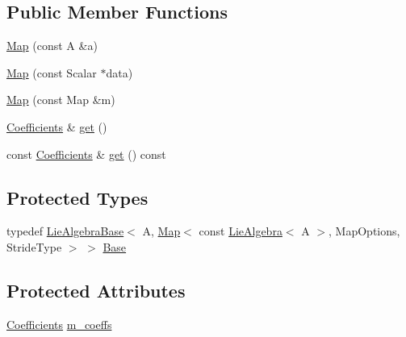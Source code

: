 \subsection*{Public Member Functions}
\begin{DoxyCompactItemize}
\item 
\hyperlink{class_map_3_01const_01_lie_algebra_3_01_a_01_4_00_01_map_options_00_01_stride_type_01_4_a1f3c2cd540feb372191254760225bf1a}{Map} (const A \&a)
\item 
\hyperlink{class_map_3_01const_01_lie_algebra_3_01_a_01_4_00_01_map_options_00_01_stride_type_01_4_a7f5161e409b77fad4e7345c82692c801}{Map} (const Scalar $\ast$data)
\item 
\hyperlink{class_map_3_01const_01_lie_algebra_3_01_a_01_4_00_01_map_options_00_01_stride_type_01_4_aa1bcc912b7d596a67e3fedd49c0a7d75}{Map} (const Map \&m)
\item 
\hyperlink{class_map_3_01const_01_lie_algebra_3_01_a_01_4_00_01_map_options_00_01_stride_type_01_4_a3173cdb7a49ee8a41f26cb0891740634}{Coefficients} \& \hyperlink{class_map_3_01const_01_lie_algebra_3_01_a_01_4_00_01_map_options_00_01_stride_type_01_4_a28ee75aa11e379eea89e0b37ab138d67}{get} ()
\item 
const \hyperlink{class_map_3_01const_01_lie_algebra_3_01_a_01_4_00_01_map_options_00_01_stride_type_01_4_a3173cdb7a49ee8a41f26cb0891740634}{Coefficients} \& \hyperlink{class_map_3_01const_01_lie_algebra_3_01_a_01_4_00_01_map_options_00_01_stride_type_01_4_ac521a54ebd19e30bf20d0a48ea0dce12}{get} () const
\end{DoxyCompactItemize}
\subsection*{Protected Types}
\begin{DoxyCompactItemize}
\item 
typedef \hyperlink{class_lie_algebra_base}{Lie\+Algebra\+Base}$<$ A, \hyperlink{class_map_3_01const_01_lie_algebra_3_01_a_01_4_00_01_map_options_00_01_stride_type_01_4_a1f3c2cd540feb372191254760225bf1a}{Map}$<$ const \hyperlink{class_lie_algebra}{Lie\+Algebra}$<$ A $>$, Map\+Options, Stride\+Type $>$ $>$ \hyperlink{class_map_3_01const_01_lie_algebra_3_01_a_01_4_00_01_map_options_00_01_stride_type_01_4_a166824ba02315d6ccc6f2eda82c268f6}{Base}
\end{DoxyCompactItemize}
\subsection*{Protected Attributes}
\begin{DoxyCompactItemize}
\item 
\hyperlink{class_map_3_01const_01_lie_algebra_3_01_a_01_4_00_01_map_options_00_01_stride_type_01_4_a3173cdb7a49ee8a41f26cb0891740634}{Coefficients} \hyperlink{class_map_3_01const_01_lie_algebra_3_01_a_01_4_00_01_map_options_00_01_stride_type_01_4_a43cc2f5492ebc7467e491b72e61642bb}{m\+\_\+coeffs}
\end{DoxyCompactItemize}


